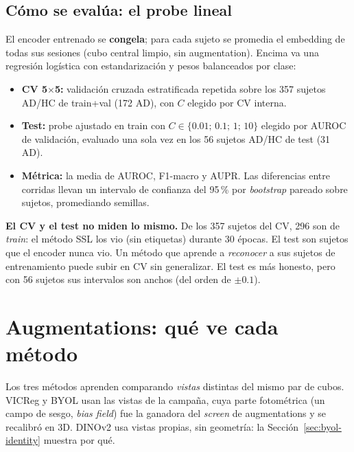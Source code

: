 \documentclass[11pt,a4paper]{article}
\begin{document}
\subsection{Cómo se evalúa: el probe lineal}
\label{sec:probe}

El encoder entrenado se \textbf{congela}; para cada sujeto se promedia el embedding de
todas sus sesiones (cubo central limpio, sin augmentation). Encima va una regresión
logística con estandarización y pesos balanceados por clase:

\begin{itemize}
\item \textbf{CV 5$\times$5:} validación cruzada estratificada repetida sobre los 357
  sujetos AD/HC de train+val (172 AD), con $C$ elegido por CV interna.
\item \textbf{Test:} probe ajustado en train con $C\in\{0.01;\,0.1;\,1;\,10\}$ elegido
  por AUROC de validación, evaluado una sola vez en los 56 sujetos AD/HC de test (31 AD).
\item \textbf{Métrica:} la media de AUROC, F1-macro y AUPR. Las diferencias entre
  corridas llevan un intervalo de confianza del 95\,\% por \emph{bootstrap} pareado sobre
  sujetos, promediando semillas.
\end{itemize}

\begin{warnbox}
\textbf{El CV y el test no miden lo mismo.} De los 357 sujetos del CV, 296 son de
\emph{train}: el método SSL los vio (sin etiquetas) durante 30 épocas. El test son
sujetos que el encoder nunca vio. Un método que aprende a \emph{reconocer} a sus sujetos
de entrenamiento puede subir en CV sin generalizar. El test es más honesto, pero con 56
sujetos sus intervalos son anchos (del orden de $\pm0.1$).
\end{warnbox}

\section{Augmentations: qué ve cada método}
\label{sec:aug}

Los tres métodos aprenden comparando \emph{vistas} distintas del mismo par de cubos.
VICReg y BYOL usan las vistas de la campaña, cuya parte fotométrica (un campo de sesgo,
\emph{bias field}) fue la ganadora del \emph{screen} de augmentations y se recalibró en 3D.
DINOv2 usa vistas propias, sin geometría: la Sección~\ref{sec:byol-identity} muestra por qué.
\end{document}
